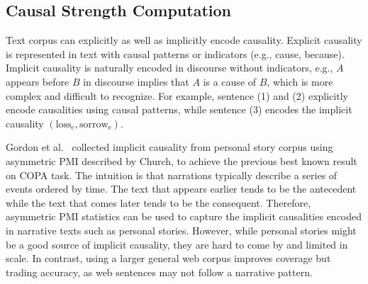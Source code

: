 \documentclass[letterpaper]{article}
\begin{document}
\subsection{Causal Strength Computation}
\label{sec:causalstrength}

Text corpus can explicitly as well as implicitly encode causality.
Explicit causality is represented in text
with causal patterns or indicators (e.g., cause, because).
Implicit causality is naturally encoded in discourse without indicators, e.g.,
$A$ appears before $B$ in discourse implies that $A$ is a cause of $B$,
which is more complex and difficult to recognize.
For example,
sentence (1) and (2) explicitly encode causalities using causal patterns,
while sentence (3) encodes the implicit causality
$(\text{loss}_{\text{c}}, \text{sorrow}_{\text{e}})$.

Gordon et al.~ collected implicit causality
from personal story corpus using asymmetric PMI described by Church,
to achieve the previous best known result on COPA task.
The intuition is that narrations typically describe a series of events
ordered by time. The text that appears earlier tends to be the antecedent
while the text that comes later tends to be the consequent.
Therefore, asymmetric PMI statistics can be used to capture
the implicit causalities encoded in narrative texts such as personal stories.
However, while personal stories might be a good source of implicit causality,
they are hard to come by and limited in scale.
In contrast, using a larger general web corpus improves coverage but
trading accuracy, as web sentences may not follow a narrative pattern.
\end{document}
